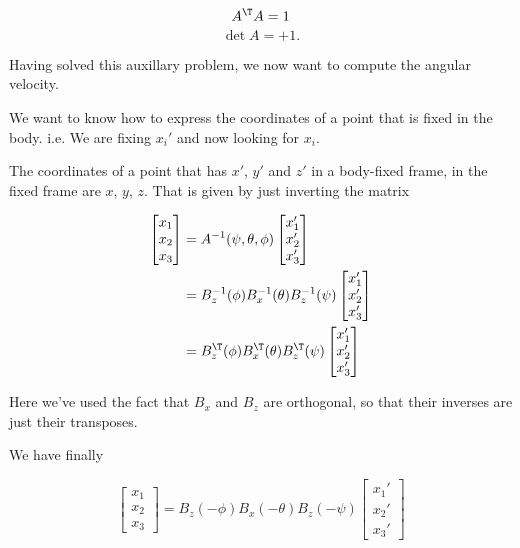 \begin{equation}\label{eqn:classicalMechanicsEulerAngles:240}
A^\T A = 1
\end{equation}
\begin{equation}\label{eqn:classicalMechanicsEulerAngles:260}
\det A = +1.
\end{equation}

Having solved this auxillary problem, we now want to compute the angular velocity.

We want to know how to express the coordinates of a point that is fixed in the body.  i.e. We are fixing $x_i'$ and now looking for $x_i$.

The coordinates of a point that has $x'$, $y'$ and $z'$ in a body-fixed frame, in the fixed frame are $x$, $y$, $z$.  That is given by just inverting the matrix

\begin{align*}
\begin{bmatrix}
x_1 \\
x_2 \\
x_3
\end{bmatrix}
&=
A^{-1}(\psi, \theta, \phi)
\begin{bmatrix}
x_1' \\
x_2' \\
x_3'
\end{bmatrix} \\
&=
B_z^{-1}(\phi)
B_x^{-1}(\theta)
B_z^{-1}(\psi)
\begin{bmatrix}
x_1' \\
x_2' \\
x_3'
\end{bmatrix} \\
&=
B_z^{\T}(\phi)
B_x^{\T}(\theta)
B_z^{\T}(\psi)
\begin{bmatrix}
x_1' \\
x_2' \\
x_3'
\end{bmatrix}
\end{align*}

Here we've used the fact that $B_x$ and $B_z$ are orthogonal, so that their inverses are just their transposes.

We have finally

\begin{equation}\label{eqn:classicalMechanicsEulerAngles:280}
\begin{bmatrix}
x_1 \\
x_2 \\
x_3
\end{bmatrix}
=
B_z(-\phi)
B_x(-\theta)
B_z(-\psi)
\begin{bmatrix}
x_1' \\
x_2' \\
x_3'
\end{bmatrix} 
\end{equation}

